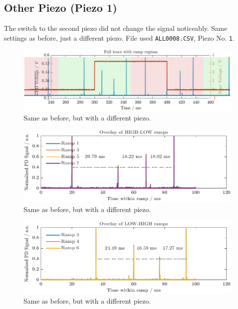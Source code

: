 \subsection{Other Piezo (Piezo 1)}
The switch to the second piezo did not change the signal noticeably.
Same settings as before, just a different piezo. File used \texttt{ALL0008.CSV}, Piezo No. \texttt{1}.
\begin{figure}[H]
    \centering
    \includegraphics[width=\textwidth]{ManyRamp/Zoomed_Ramp2.pdf}
    \caption{Same as before, but with a different piezo.}
\end{figure}


\begin{figure}[H]
    \centering
    \includegraphics[width=\textwidth]{ManyRamp/HiLo2.pdf}
    \caption{Same as before, but with a different piezo.}
\end{figure}

\begin{figure}[H]
    \centering
    \includegraphics[width=\textwidth]{ManyRamp/LoHi2.pdf}
    \caption{Same as before, but with a different piezo.}
\end{figure}
